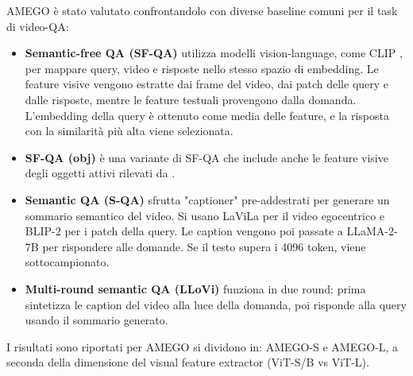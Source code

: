 AMEGO è stato valutato confrontandolo con diverse baseline comuni per il task di video-QA:
\begin{itemize}
    \item \textbf{Semantic-free QA (SF-QA)} utilizza modelli vision-language, come CLIP \cite{radford2021learningtransferablevisualmodels}, per mappare query, video e risposte nello stesso spazio di embedding. Le feature visive vengono estratte dai frame del video, dai patch delle query e dalle risposte, mentre le feature testuali provengono dalla domanda. L'embedding della query è ottenuto come media delle feature, e la risposta con la similarità più alta viene selezionata.
    
    \item \textbf{SF-QA (obj)} è una variante di SF-QA che include anche le feature visive degli oggetti attivi rilevati da \cite{shan2020understandinghumanhandscontact}.
    
    \item \textbf{Semantic QA (S-QA)} sfrutta "captioner" pre-addestrati per generare un sommario semantico del video. Si usano LaViLa \cite{zhao2022learningvideorepresentationslarge} per il video egocentrico e BLIP-2 \cite{li2023blip2bootstrappinglanguageimagepretraining} per i patch della query. Le caption vengono poi passate a LLaMA-2-7B \cite{touvron2023llama2openfoundation} per rispondere alle domande. Se il testo supera i 4096 token, viene sottocampionato.
    
    \item \textbf{Multi-round semantic QA (LLoVi)} \cite{zhang2024simplellmframeworklongrange} funziona in due round: prima sintetizza le caption del video alla luce della domanda, poi risponde alla query usando il sommario generato.
\end{itemize}

I risultati sono riportati per AMEGO si dividono in: AMEGO-S e AMEGO-L, a seconda della dimensione del visual feature extractor (ViT-S/B vs ViT-L).

